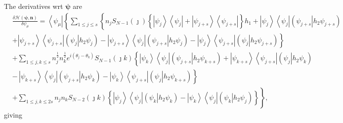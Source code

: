 \documentclass[aps,preprint]{revtex4}%
\begin{document}
The derivatives wrt $\mathbf{\psi}$ are
\begin{align}
&  \frac{\delta\mathcal{H}\left(  \mathbf{\psi,n}\right)  }{\delta\psi_{\mu}%
}=\left\langle \psi_{\mu}\right\vert \left\{  \sum_{1\leq j\leq s}\left\{
n_{j}S_{N-1}\left(  \jmath\right)  \left\{  \left\vert \psi_{j}\right\rangle
\left\langle \psi_{j}\right\vert +\left\vert \psi_{j+s}\right\rangle
\left\langle \psi_{j+s}\right\vert \right\}  h_{1}+\left\vert \psi
_{j}\right\rangle \left\langle \psi_{j}\right\vert \left(  \left.  \psi
_{j+s}\right\vert h_{2}\psi_{j+s}\right)  \right.  \right.  \nonumber\\
&  \left.  +\left\vert \psi_{j+s}\right\rangle \left\langle \psi
_{j+s}\right\vert \left(  \left.  \psi_{j}\right\vert h_{2}\psi_{j}\right)
-\left\vert \psi_{j+s}\right\rangle \left\langle \psi_{j}\right\vert \left(
\left.  \psi_{j+s}\right\vert h_{2}\psi_{j}\right)  -\left\vert \psi
_{j}\right\rangle \left\langle \psi_{j+s}\right\vert \left(  \left.  \psi
_{j}\right\vert h_{2}\psi_{j+s}\right)  \right\}  \nonumber\\
&  +\sum_{1\leq j,k\leq s}n_{j}^{\frac{1}{2}}n_{k}^{\frac{1}{2}}e^{i\left(
\theta_{j}-\theta_{k}\right)  }S_{N-1}\left(  \jmath k\right)  \left\{
\left\vert \psi_{k}\right\rangle \left\langle \psi_{j}\right\vert \left(
\left.  \psi_{j+s}\right\vert h_{2}\psi_{k+s}\right)  +\left\vert \psi
_{k+s}\right\rangle \left\langle \psi_{j+s}\right\vert \left(  \left.
\psi_{j}\right\vert h_{2}\psi_{k}\right)  \right.  \nonumber\\
&  \left.  -\,\left\vert \psi_{k+s}\right\rangle \left\langle \psi
_{j}\right\vert \left(  \left.  \psi_{j+s}\right\vert h_{2}\psi_{k}\right)
-\left\vert \psi_{k}\right\rangle \left\langle \psi_{j+s}\right\vert \left(
\left.  \psi_{j}\right\vert h_{2}\psi_{k+s}\right)  \right\}  \nonumber\\
&  +\sum_{1\leq j,k\leq2s}n_{j}n_{k}S_{N-2}\left(  \jmath k\right)  \left.
\overset{}{\left\{  \left\vert \psi_{j}\right\rangle \left\langle \psi
_{j}\right\vert \left(  \left.  \psi_{k}\right\vert h_{2}\psi_{k}\right)
-\left\vert \psi_{k}\right\rangle \left\langle \psi_{j}\right\vert \left(
\left.  \psi_{k}\right\vert h_{2}\psi_{j}\right)  \right\}  }\right\}
,\label{der2}%
\end{align}
giving
\end{document}
